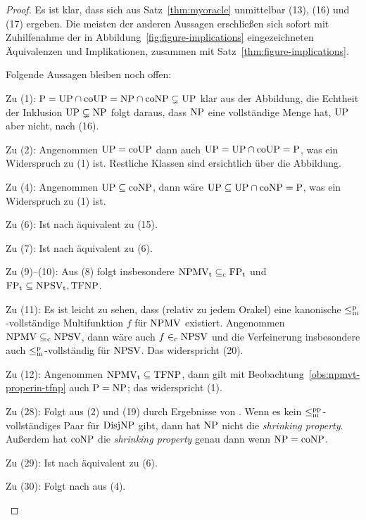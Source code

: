 \begin{proof}
Es ist klar, dass sich aus Satz~\ref{thm:myoracle} unmittelbar (13), (16) und (17) ergeben.
Die meisten der anderen Aussagen erschließen sich sofort mit Zuhilfenahme der in Abbildung~\ref{fig:figure-implications} eingezeichneten Äquivalenzen und Implikationen, zusammen mit Satz~\ref{thm:figure-implications}.

Folgende Aussagen bleiben noch offen:
\begin{prooflist}[nosep,midpenalty=0]
\item Zu (1): $\mathrm{P}=\mathrm{UP}\cap\mathrm{coUP}=\mathrm{NP}\cap\mathrm{coNP}\subsetneq\mathrm{UP}$ klar aus der Abbildung, die Echtheit der Inklusion $\mathrm{UP}\subsetneq\mathrm{NP}$ folgt daraus, dass $\mathrm{NP}$ eine vollständige Menge hat, $\mathrm{UP}$ aber nicht, nach (16).
\item Zu (2): Angenommen $\mathrm{UP}=\mathrm{coUP}$ dann auch $\mathrm{UP}=\mathrm{UP}\cap\mathrm{coUP}=\mathrm{P}$, was ein Widerspruch zu (1) ist. Restliche Klassen sind ersichtlich über die Abbildung.
\item Zu (4): Angenommen $\mathrm{UP}\subseteq\mathrm{coNP}$, dann wäre $\mathrm{UP}\subseteq \mathrm{UP}\cap\mathrm{coNP}=\mathrm{P}$, was ein Widerspruch zu (1) ist.
\item Zu (6): Ist nach \textcite[Thm.~4]{fenner_inverting_2003} äquivalent zu (15).
\item Zu (7): Ist nach \textcite[Thm.~14]{fenner_inverting_2003} äquivalent zu (6).
\item Zu (9)–(10): Aus (8) folgt insbesondere $\mathrm{NPMV_t}\subseteq_\mathrm{c} \mathrm{FP}_\mathrm{t}$ und $\mathrm{FP}_\mathrm{t}\subseteq \mathrm{NPSV_t}, \mathrm{TFNP}$.
\item Zu (11): Es ist leicht zu sehen, dass (relativ zu jedem Orakel) eine kanonische $\leq_\mathrm{m}^\mathrm{p}$-vollständige Multifunktion $f$ für $\mathrm{NPMV}$ existiert. Angenommen $\mathrm{NPMV} \subseteq_{\mathrm{c}} \mathrm{NPSV}$, dann wäre auch $f\in_\mathrm{c} \mathrm{NPSV}$ und die Verfeinerung insbesondere auch $\leq_\mathrm{m}^\mathrm{p}$-vollständig für $\mathrm{NPSV}$.
    Das widerspricht (20). 
\item Zu (12): Angenommen $\mathrm{NPMV_t}\subseteq \mathrm{TFNP}$, dann gilt mit Beobachtung~\ref{obs:npmvt-properin-tfnp} auch $\mathrm{P}=\mathrm{NP}$; das widerspricht (1).
\item Zu (28): Folgt aus (2) und (19) durch Ergebnisse von \textcite{glaser_shrinking_2011}. Wenn es kein $\leq_\mathrm{m}^\mathrm{pp}$-vollständiges Paar für $\mathrm{DisjNP}$ gibt, dann hat $\mathrm{NP}$ nicht die \emph{shrinking property}. Außerdem hat $\mathrm{coNP}$ die \emph{shrinking property} genau dann wenn $\mathrm{NP}=\mathrm{coNP}$.
\item Zu (29): Ist nach \textcite{glaser_shrinking_2011} äquivalent zu (6).
\item Zu (30): Folgt nach \textcite{glaser_shrinking_2011} aus (4).
\end{prooflist}
\end{proof}




